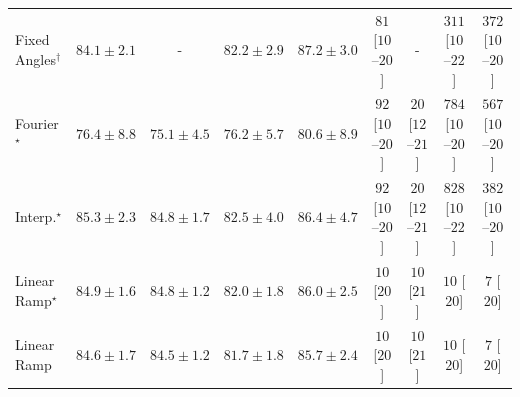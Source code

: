 \begin{tabular}{l|cccc|cccc|}
Fixed Angles$^\dagger$ & {\cellcolor[HTML]{045687}} \color[HTML]{F1F1F1} $84.1\pm 2.1$ & {\cellcolor[HTML]{000000}} \color[HTML]{F1F1F1} {\cellcolor{white}} \color{black} - & {\cellcolor[HTML]{046198}} \color[HTML]{F1F1F1} $82.2\pm 2.9$ & {\cellcolor[HTML]{023E62}} \color[HTML]{F1F1F1} $87.2\pm 3.0$ & {\cellcolor[HTML]{FEE6E3}} \color[HTML]{000000} $81$ [$10$--$20$] & {\cellcolor[HTML]{000000}} \color[HTML]{F1F1F1} {\cellcolor{white}} \color{black} - & {\cellcolor[HTML]{FAA1B6}} \color[HTML]{000000} $311$ [$10$--$22$] & {\cellcolor[HTML]{F881AA}} \color[HTML]{F1F1F1} $372$ [$10$--$20$] \\
Fourier$^\star$ & {\cellcolor[HTML]{2484BA}} \color[HTML]{F1F1F1} $76.4\pm 8.8$ & {\cellcolor[HTML]{328DBF}} \color[HTML]{F1F1F1} $75.1\pm 4.5$ & {\cellcolor[HTML]{2685BB}} \color[HTML]{F1F1F1} $76.2\pm 5.7$ & {\cellcolor[HTML]{0569A4}} \color[HTML]{F1F1F1} $80.6\pm 8.9$ & {\cellcolor[HTML]{FDE4E1}} \color[HTML]{000000} $92$ [$10$--$20$] & {\cellcolor[HTML]{FFF4F0}} \color[HTML]{000000} $20$ [$12$--$21$] & {\cellcolor[HTML]{5D006F}} \color[HTML]{F1F1F1} $784$ [$10$--$20$] & {\cellcolor[HTML]{C71D8C}} \color[HTML]{F1F1F1} $567$ [$10$--$20$] \\
Interp.$^\star$ & {\cellcolor[HTML]{034D79}} \color[HTML]{F1F1F1} $85.3\pm 2.3$ & {\cellcolor[HTML]{03517E}} \color[HTML]{F1F1F1} $84.8\pm 1.7$ & {\cellcolor[HTML]{046096}} \color[HTML]{F1F1F1} $82.5\pm 4.0$ & {\cellcolor[HTML]{03456C}} \color[HTML]{F1F1F1} $86.4\pm 4.7$ & {\cellcolor[HTML]{FDE4E1}} \color[HTML]{000000} $92$ [$10$--$20$] & {\cellcolor[HTML]{FFF4F0}} \color[HTML]{000000} $20$ [$12$--$21$] & {\cellcolor[HTML]{49006A}} \color[HTML]{F1F1F1} $828$ [$10$--$22$] & {\cellcolor[HTML]{F87CA8}} \color[HTML]{F1F1F1} $382$ [$10$--$20$] \\
Linear Ramp$^\star$ & {\cellcolor[HTML]{03517E}} \color[HTML]{F1F1F1} $84.9\pm 1.6$ & {\cellcolor[HTML]{03517E}} \color[HTML]{F1F1F1} $84.8\pm 1.2$ & {\cellcolor[HTML]{046299}} \color[HTML]{F1F1F1} $82.0\pm 1.8$ & {\cellcolor[HTML]{034871}} \color[HTML]{F1F1F1} $86.0\pm 2.5$ & {\cellcolor[HTML]{FFF7F3}} \color[HTML]{000000} $10$ [$20$] & {\cellcolor[HTML]{FFF7F3}} \color[HTML]{000000} $10$ [$21$] & {\cellcolor[HTML]{FFF7F3}} \color[HTML]{000000} $10$ [$20$] & {\cellcolor[HTML]{FFF7F3}} \color[HTML]{000000} $7$ [$20$] \\
Linear Ramp & {\cellcolor[HTML]{045382}} \color[HTML]{F1F1F1} $84.6\pm 1.7$ & {\cellcolor[HTML]{045382}} \color[HTML]{F1F1F1} $84.5\pm 1.2$ & {\cellcolor[HTML]{04649D}} \color[HTML]{F1F1F1} $81.7\pm 1.8$ & {\cellcolor[HTML]{034A74}} \color[HTML]{F1F1F1} $85.7\pm 2.4$ & {\cellcolor[HTML]{FFF7F3}} \color[HTML]{000000} $10$ [$20$] & {\cellcolor[HTML]{FFF7F3}} \color[HTML]{000000} $10$ [$21$] & {\cellcolor[HTML]{FFF7F3}} \color[HTML]{000000} $10$ [$20$] & {\cellcolor[HTML]{FFF7F3}} \color[HTML]{000000} $7$ [$20$] \\

\end{tabular}
